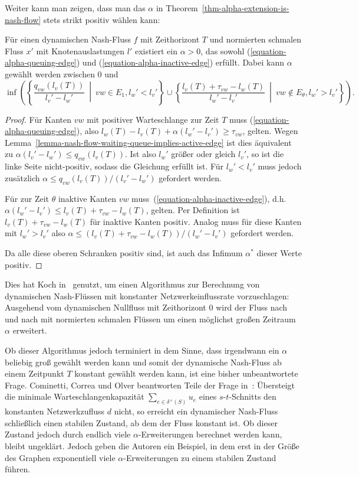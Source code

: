 Weiter kann man zeigen, dass man das $\alpha$ in Theorem~\ref{thm-alpha-extension-is-nash-flow} stets strikt positiv wählen kann:
\begin{proposition}
	Für einen dynamischen Nash-Fluss $f$ mit Zeithorizont $T$ und normierten schmalen Fluss $x'$ mit Knotenauslastungen $l'$ existiert ein $\alpha>0$, das sowohl (\ref{equation-alpha-queuing-edge}) und (\ref{equation-alpha-inactive-edge}) erfüllt.
	Dabei kann $\alpha$ gewählt werden zwischen $0$ und \[
	\inf\left(\left\{ \frac{q_{vw}(l_v(T))}{l_v' - l_w'} ~\middle|~ vw\in E_1, l_w' < l_v' \right\} \cup \left\{ \frac{l_v(T) + \tau_{vw} -l_w(T)}{l_w' - l_v'} ~\middle|~ vw\notin E_\theta, l_w' > l_v' \right\}\right).
	\]
\end{proposition}
\begin{proof}
	Für Kanten $vw$ mit positiver Warteschlange zur Zeit $T$ muss (\ref{equation-alpha-queuing-edge}), also $l_w(T) - l_v(T) + \alpha(l_w' - l_v') \geq \tau_{vw}$, gelten.
	Wegen Lemma~\ref{lemma-nash-flow-waiting-queue-implies-active-edge} ist dies äquivalent zu $\alpha(l_v' - l_w') \leq q_{vw}(l_v(T))$.
	Ist also $l_w'$ größer oder gleich $l_v'$, so ist die linke Seite nicht-positiv, sodass die Gleichung erfüllt ist.
	Für $l_w' < l_v'$ muss jedoch zusätzlich $\alpha\leq q_{vw}(l_v(T)) / (l_v' - l_w')$ gefordert werden.
	
	Für zur Zeit $\theta$ inaktive Kanten $vw$ muss~(\ref{equation-alpha-inactive-edge}), d.h. $\alpha(l_w' -l_v') \leq l_v(T) + \tau_{vw} - l_w(T)$, gelten.
	Per Definition ist $l_v(T) + \tau_{vw} - l_w(T)$ für inaktive Kanten positiv.
	Analog muss für diese Kanten mit $l_w' > l_v'$ also $\alpha \leq (l_v(T) + \tau_{vw} -l_w(T))/(l_w' - l_v')$ gefordert werden.
	
	Da alle diese oberen Schranken positiv sind, ist auch das Infimum $\alpha^*$ dieser Werte positiv.
\end{proof}

Dies hat Koch in~\cite{Koch2011} genutzt, um einen Algorithmus zur Berechnung von dynamischen Nash-Flüssen mit konstanter Netzwerkeinflussrate vorzuschlagen:
Ausgehend vom dynamischen Nullfluss mit Zeithorizont $0$ wird der Fluss nach und nach mit normierten schmalen Flüssen um einen möglichst großen Zeitraum $\alpha$ erweitert.

Ob dieser Algorithmus jedoch terminiert in dem Sinne, dass irgendwann ein $\alpha$ beliebig groß gewählt werden kann und somit der dynamische Nash-Fluss ab einem Zeitpunkt $T$ konstant gewählt werden kann, ist eine bisher unbeantwortete Frage.
Cominetti, Correa und Olver beantworten Teile der Frage in~\cite{CominettiExample}:
Übersteigt die minimale Warteschlangenkapazität $\sum_{e\in\delta^+(S)} u_e$ eines $s$-$t$-Schnitts den konstanten Netzwerkzufluss $d$ nicht, so erreicht ein dynamischer Nash-Fluss schließlich einen stabilen Zustand, ab dem der Fluss konstant ist.
Ob dieser Zustand jedoch durch endlich viele $\alpha$-Erweiterungen berechnet werden kann, bleibt ungeklärt.
Jedoch geben die Autoren ein Beispiel, in dem erst in der Größe des Graphen exponentiell viele $\alpha$-Erweiterungen zu einem stabilen Zustand führen.

